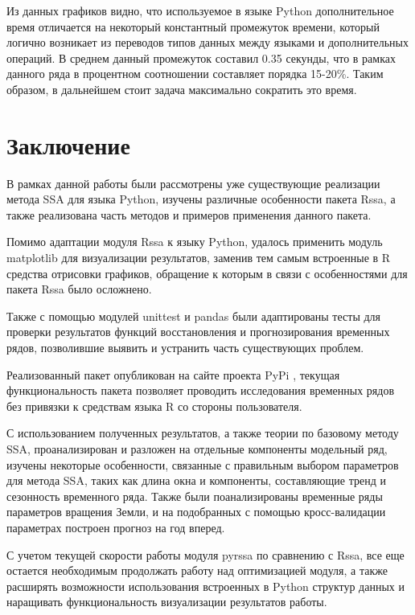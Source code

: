\documentclass[specialist,
			   substylefile = spbu_report.rtx,
			   subf,href,colorlinks=true, 12pt]{disser}
\begin{document}
Из данных графиков видно, что используемое в языке Python дополнительное время отличается на некоторый константный промежуток времени, который логично возникает из переводов типов данных между языками и дополнительных операций. В среднем данный промежуток составил 0.35 секунды, что в рамках данного ряда в процентном соотношении составляет порядка 15-20\%. Таким образом, в дальнейшем стоит задача максимально сократить это время.

\chapter{Заключение}

В рамках данной работы были рассмотрены уже существующие реализации метода SSA для языка Python, изучены различные особенности пакета Rssa, а также реализована часть методов и примеров применения данного пакета.

Помимо адаптации модуля Rssa к языку Python, удалось применить модуль matplotlib для визуализации результатов, заменив тем самым встроенные в R средства отрисовки графиков, обращение к которым в связи с особенностями для пакета Rssa было осложнено.

Также с помощью модулей unittest и pandas были адаптированы тесты для проверки результатов функций восстановления и прогнозирования временных рядов, позволившие выявить и устранить часть существующих проблем.

Реализованный пакет опубликован на сайте проекта PyPi \cite{pyrssa-lib}, текущая функциональность пакета позволяет проводить исследования временных рядов без привязки к средствам языка R со стороны пользователя.

С использованием полученных результатов, а также теории по базовому методу SSA, проанализирован и разложен на отдельные компоненты модельный ряд, изучены некоторые особенности, связанные с правильным выбором параметров для метода SSA, таких как длина окна и компоненты, составляющие тренд и сезонность временного ряда. Также были поанализированы временные ряды параметров вращения Земли, и на подобранных с помощью кросс-валидации параметрах построен прогноз на год вперед.

С учетом текущей скорости работы модуля pyrssa по сравнению с Rssa, все еще остается необходимым продолжать работу над оптимизацией модуля, а также расширять возможности использования встроенных в Python структур данных и наращивать функциональность визуализации результатов работы.

\printbibliography
{}
\end{document}
